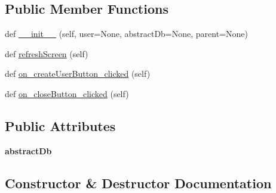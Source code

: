 \subsection*{Public Member Functions}
\begin{DoxyCompactItemize}
\item 
def \mbox{\hyperlink{class_dsg_tools_1_1_user_tools_1_1create__user_1_1_create_user_a1950fa38682fc37cb8a34e9ba9095822}{\+\_\+\+\_\+init\+\_\+\+\_\+}} (self, user=None, abstract\+Db=None, parent=None)
\item 
def \mbox{\hyperlink{class_dsg_tools_1_1_user_tools_1_1create__user_1_1_create_user_ac66430f2c2cb2d036c4eda919bb2cca0}{refresh\+Screen}} (self)
\item 
def \mbox{\hyperlink{class_dsg_tools_1_1_user_tools_1_1create__user_1_1_create_user_a5814b4fb14668666b538a934fd7f1ada}{on\+\_\+create\+User\+Button\+\_\+clicked}} (self)
\item 
def \mbox{\hyperlink{class_dsg_tools_1_1_user_tools_1_1create__user_1_1_create_user_aec7f0b7fca0fab38d46ee9c4adce153f}{on\+\_\+close\+Button\+\_\+clicked}} (self)
\end{DoxyCompactItemize}
\subsection*{Public Attributes}
\begin{DoxyCompactItemize}
\item 
\mbox{\label{class_dsg_tools_1_1_user_tools_1_1create__user_1_1_create_user_a752620f4e0439175f328c51a1d21c57d}} 
{\bfseries abstract\+Db}
\end{DoxyCompactItemize}


\subsection{Constructor \& Destructor Documentation}
\mbox{\label{class_dsg_tools_1_1_user_tools_1_1create__user_1_1_create_user_a1950fa38682fc37cb8a34e9ba9095822}} 
